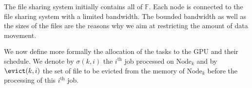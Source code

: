 \documentclass[a4paper]{article}
\newcommand{\Node}[1]{\ensuremath{\mathrm{Node}_{#1}}\xspace}
\newcommand{\inputs}{\ensuremath{\mathcal{F}}\xspace}
\newcommand{\fileset}{\ensuremath{\mathbb{F}}\xspace}
\begin{document}
The file sharing system initially contains all of $\fileset$.
Each node is connected to the file sharing system with a limited bandwidth.
The bounded bandwidth as well as the sizes of the files are the reasons why
we aim at restricting the amount of data movement.

We now define more formally the allocation of the tasks to the GPU and
their schedule.
We denote by $\sigma(k,i)$ the $i^\text{th}$ job
processed on $\Node{k}$ and by $\evict(k,i)$ the set of file to
be evicted from the memory of $\Node{k}$ before the processing
of this $i^\text{th}$ job.

\end{document}
